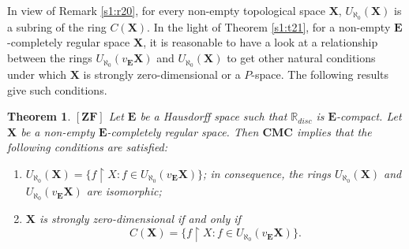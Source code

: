\documentclass[12pt,twoside,leqno]{article}
\theoremstyle{plain}
\newtheorem{theorem}{Theorem}[section]
\theoremstyle{definition}
\theoremstyle{remark}
\begin{document}
In view of Remark \ref{s1:r20}, for every non-empty topological space $\mathbf{X}$, $U_{\aleph_0}(\mathbf{X})$ is a subring of the ring $C(\mathbf{X})$. In the light of Theorem \ref{s1:t21}, for a non-empty $\mathbf{E}$-completely regular space $\mathbf{X}$, it is reasonable to have a look at a relationship between the rings $U_{\aleph_0}(v_{\mathbf{E}}\mathbf{X})$ and $U_{\aleph_0}(\mathbf{X})$ to get other natural conditions under which $\mathbf{X}$ is strongly zero-dimensional or a $P$-space. The following results give such conditions.

\begin{theorem}
	\label{s5:t4}
	$[\mathbf{ZF}]$ 
	Let $\mathbf{E}$ be a Hausdorff space such that $\mathbb{R}_{disc}$ is $\mathbf{E}$-compact. Let $\mathbf{X}$ be a non-empty $\mathbf{E}$-completely regular space. Then $\mathbf{CMC}$ implies that the following conditions are satisfied: 
	\begin{enumerate}
		\item[(i)] $U_{\aleph_0}(\mathbf{X})=\{f\upharpoonright X: f\in U_{\aleph_0}(v_{\mathbf{E}}\mathbf{X})\}$; in consequence, the rings $U_{\aleph_0}(\mathbf{X})$ and $U_{\aleph_0}(v_{\mathbf{E}}\mathbf{X})$ are isomorphic;
		\item[(ii)] $\mathbf{X}$ is strongly zero-dimensional if and only if $$C(\mathbf{X})=\{f\upharpoonright X: f\in U_{\aleph_0}(v_{\mathbf{E}}\mathbf{X})\}.$$
	\end{enumerate}
\end{theorem}
\end{document}
